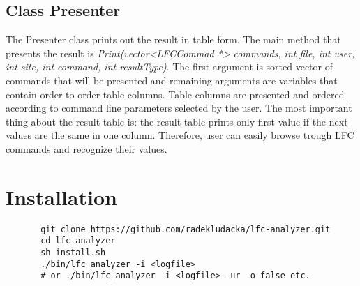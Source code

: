 \documentclass[a4paper, 11pt]{article} %
\begin{document}
\subsection{Class Presenter}
\label{c:presenter}

The Presenter class prints out the result in table form. The main method that presents the result is \textit{Print(vector<LFCCommad *> commands, int file, int user, int site, int command, int resultType)}. The first argument is sorted vector of commands that will be presented and remaining arguments are variables that contain order to order table columns. Table columns are presented and ordered according to command line parameters selected by the user. The most important thing about the result table is: the result table prints only first value if the next values are the same in one column. Therefore, user can easily browse trough LFC commands and recognize their values.


\section*{Installation}

    \begin{verbatim}
       git clone https://github.com/radekludacka/lfc-analyzer.git
       cd lfc-analyzer
       sh install.sh
       ./bin/lfc_analyzer -i <logfile>
       # or ./bin/lfc_analyzer -i <logfile> -ur -o false etc.
    \end{verbatim}







\end{document}
